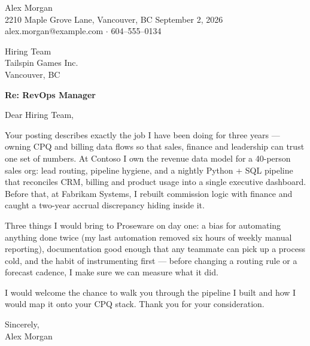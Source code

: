 \documentclass[letterpaper,11pt]{article}
\begin{document}
Alex Morgan \\
2210 Maple Grove Lane, Vancouver, BC \hfill September 2, 2026 \\
alex.morgan@example.com $\cdot$ 604--555--0134

\vspace{18pt}
Hiring Team \\
Tailspin Games Inc. \\
Vancouver, BC

\vspace{18pt}
\textbf{Re: RevOps Manager}

\vspace{10pt}
Dear Hiring Team,

Your posting describes exactly the job I have been doing for three years — owning CPQ and billing data flows so that sales, finance and leadership can trust one set of numbers. At Contoso I own the revenue data model for a 40-person sales org: lead routing, pipeline hygiene, and a nightly Python + SQL pipeline that reconciles CRM, billing and product usage into a single executive dashboard. Before that, at Fabrikam Systems, I rebuilt commission logic with finance and caught a two-year accrual discrepancy hiding inside it.

Three things I would bring to Proseware on day one: a bias for automating anything done twice (my last automation removed six hours of weekly manual reporting), documentation good enough that any teammate can pick up a process cold, and the habit of instrumenting first — before changing a routing rule or a forecast cadence, I make sure we can measure what it did.

I would welcome the chance to walk you through the pipeline I built and how I would map it onto your CPQ stack. Thank you for your consideration.

\vspace{18pt}
Sincerely,\\
Alex Morgan
\end{document}
